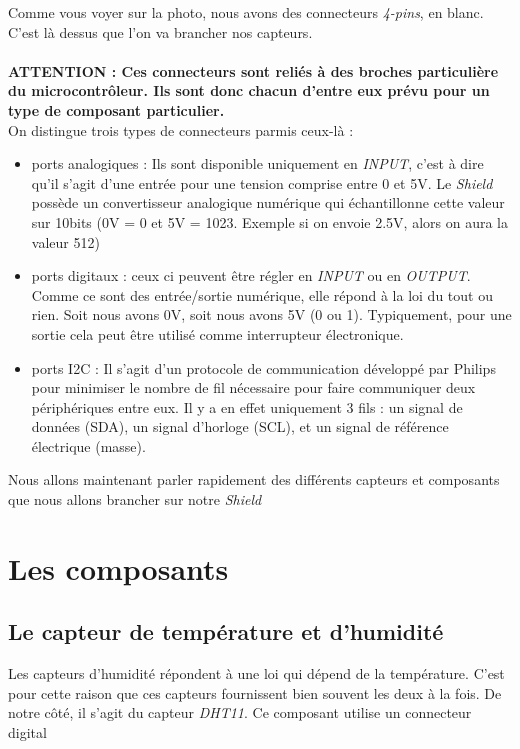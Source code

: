 Comme vous voyer sur la photo, nous avons des connecteurs \textit{4-pins}, en blanc. C'est là dessus que l'on va brancher nos capteurs.\\
\\
\textbf{ATTENTION : Ces connecteurs sont reliés à des broches particulière du microcontrôleur. Ils sont donc chacun d'entre eux prévu pour un type de composant particulier. } \\

On distingue trois types de connecteurs parmis ceux-là :

\begin{itemize}
	\item ports analogiques : Ils sont disponible uniquement en \textit{INPUT}, c'est à dire qu'il s'agit d'une entrée pour une tension comprise entre 0 et 5V. Le \textit{Shield} possède un convertisseur analogique numérique qui échantillonne cette valeur sur 10bits (0V = 0 et 5V = 1023. Exemple si on envoie 2.5V, alors on aura la valeur 512)
	
	\item ports digitaux : ceux ci peuvent être régler en \textit{INPUT} ou en \textit{OUTPUT}. Comme ce sont des entrée/sortie numérique, elle répond à la loi du tout ou rien. Soit nous avons 0V, soit nous avons 5V (0 ou 1). Typiquement, pour une sortie cela peut être utilisé comme interrupteur électronique.
	\item ports I2C : Il s'agit d'un protocole de communication développé par Philips pour minimiser le nombre de fil nécessaire pour faire communiquer deux périphériques entre eux. Il y a en effet uniquement 3 fils : un signal de données (SDA), un signal d'horloge (SCL), et un signal de référence électrique (masse).
\end{itemize}

Nous allons maintenant parler rapidement des différents capteurs et composants que nous allons brancher sur notre \textit{Shield}

\section{Les composants}

\subsection{Le capteur de température et d'humidité}

Les capteurs d'humidité répondent à une loi qui dépend de la température. C'est pour cette raison que ces capteurs fournissent bien souvent les deux à la fois. De notre côté, il s'agit du capteur \textit{DHT11}. Ce composant utilise un connecteur digital\\

